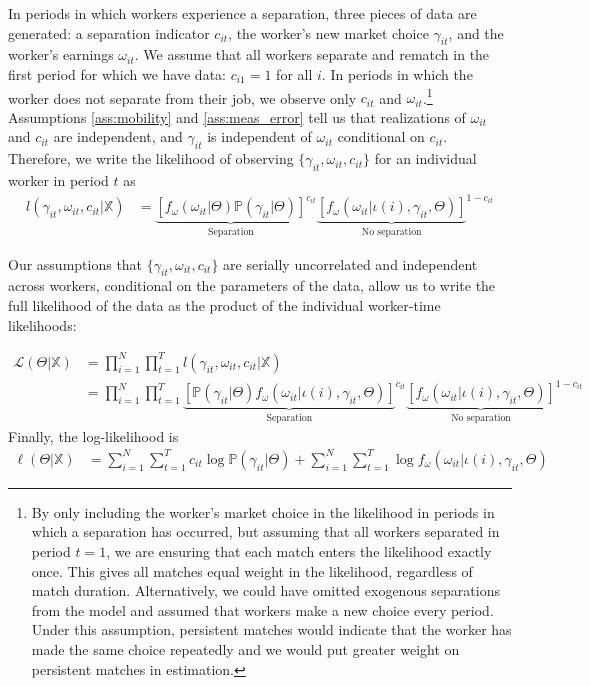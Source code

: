 \documentclass[12pt]{article}
\def\g{\gamma}
\def\i{\iota}
\renewcommand{\P}{\mathbb {P}}
\theoremstyle{definition}
\theoremstyle{plain}
\begin{document}
In periods in which workers experience a separation, three pieces of data are generated: a separation indicator $c_{it}$, the worker's new market choice $\g_{it}$, and the worker's earnings $\omega_{it}$. We assume that all workers separate and rematch in the first period for which we have data: $c_{i1}=1$ for all $i$. In periods in which the worker does not separate from their job, we observe only $c_{it}$ and  $\omega_{it}$.\footnote{By only including the worker's market choice in the likelihood in periods in which a separation has occurred, but assuming that all workers separated in period $t=1$, we are ensuring that each match enters the likelihood exactly once. This gives all matches equal weight in the likelihood, regardless of match duration. Alternatively, we could have omitted exogenous separations from the model and assumed that workers make a new choice every period. Under this assumption, persistent matches would indicate that the worker has made the same choice repeatedly and we would put greater weight on persistent matches in estimation.}  Assumptions \ref{ass:mobility} and \ref{ass:meas_error} tell us that realizations of $\omega_{it}$ and $c_{it}$ are independent, and $\g_{it}$ is independent of $\omega_{it}$ conditional on $c_{it}$. Therefore, we write the likelihood of observing $\{\g_{it},\omega_{it}, c_{it}\}$ for an individual worker in period $t$ as
\begin{align*}
l(\g_{it},\omega_{it}, c_{it}|\mathbb{X}) &= \underset{\text{Separation}}{\underbrace{\left[ f_{\omega}(\omega_{it}|\Theta) \P(\g_{it}|\Theta) \right] }}^{c_{it}}\underset{\text{No separation}}{\underbrace{\left[ f_{\omega}(\omega_{it}|\i(i), \g_{it},\Theta)\right]}}^{1-c_{it}}
\end{align*}


Our assumptions that $\{\g_{it},\omega_{it}, c_{it}\}$ are serially uncorrelated and independent across workers, conditional on the parameters of the data, allow us to write the full likelihood of the data as the product of the individual worker-time likelihoods:

\begin{align}
\mathcal{L}(\Theta | \mathbb{X}) 	&=  \prod_{i = 1}^N  \prod_{t=1}^{T} l(\g_{it},\omega_{it}, c_{it}|\mathbb{X}) \nonumber \\
&= \prod_{i = 1}^N  \prod_{t=1}^{T} \underset{\text{Separation}}{\underbrace{\left[ \P(\g_{it}|\Theta)f_{\omega}(\omega_{it}|\i(i), \g_{it},\Theta) \right] }}^{c_{it}}\underset{\text{No separation}}{\underbrace{\left[ f_{\omega}(\omega_{it}|\i(i), \g_{it},\Theta)\right]}}^{1-c_{it}}  
\end{align}
Finally, the log-likelihood is
\begin{align}
\ell(\Theta | \mathbb{X}) 	&=  \sum_{i=1}^{N}\sum_{t = 1}^T c_{it} \log \P(\g_{it}|\Theta) + \sum_{i=1}^{N}\sum_{t = 1}^T \log f_{\omega}(\omega_{it}|\i(i), \g_{it}, \Theta) \label{eq:log_likelihood}
\end{align}
\end{document}
